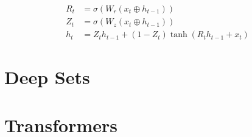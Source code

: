 \begin{align}
    R_t &= \sigma(W_r (x_t \oplus h_{t-1})) \\
    Z_t &= \sigma(W_z (x_t \oplus h_{t-1})) \\
    h_t &= Z_t h_{t-1} + (1-Z_t)\tanh(R_t h_{t-1} + x_t)
\end{align}

\section{Deep Sets}

\section{Transformers}